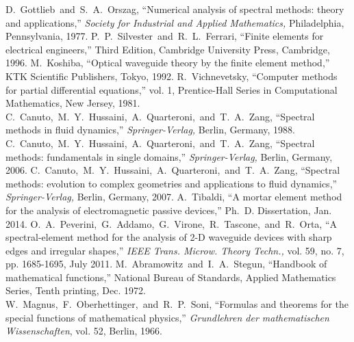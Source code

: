 \documentclass[a4paper,12pt]{article}
\begin{document}














\begin{thebibliography}{99}
 D.~Gottlieb~and~S.~A.~Orszag, ``Numerical analysis of spectral methods: theory and applications,'' \textit{Society for Industrial and Applied Mathematics,} Philadelphia, Pennsylvania, 1977.
 P.~P.~Silvester~and~R.~L.~Ferrari, ``Finite elements for electrical engineers,'' Third Edition, Cambridge University Press, Cambridge, 1996.
 M.~Koshiba, ``Optical waveguide theory by the finite element method,'' KTK Scientific Publishers, Tokyo, 1992.
 R.~Vichnevetsky, ``Computer methods for partial differential equations,'' vol. 1, Prentice-Hall Series in Computational Mathematics, New Jersey, 1981.
 C.~Canuto,~M.~Y.~Hussaini,~A.~Quarteroni,~and~T.~A.~Zang, ``Spectral methods in fluid dynamics,'' \textit{Springer-Verlag,} Berlin, Germany, 1988.
 C.~Canuto,~M.~Y.~Hussaini,~A.~Quarteroni,~and~T.~A.~Zang, ``Spectral methods: fundamentals in single domains,'' \textit{Springer-Verlag,} Berlin, Germany, 2006.
 C.~Canuto,~M.~Y.~Hussaini,~A.~Quarteroni,~and~T.~A.~Zang, ``Spectral methods: evolution to complex geometries and applications to fluid dynamics,'' \textit{Springer-Verlag,} Berlin, Germany, 2007.
 A.~Tibaldi, ``A mortar element method for the analysis of electromagnetic passive devices,'' Ph.~D. Dissertation, Jan. 2014.
 O.~A.~Peverini,~G.~Addamo,~G.~Virone,~R.~Tascone,~and~R.~Orta, ``A spectral-element method for the analysis of 2-D waveguide devices with sharp edges and irregular shapes,'' \emph{IEEE Trans. Microw. Theory Techn.,} vol. 59, no. 7, pp. 1685-1695, July 2011.
 M.~Abramowitz~and~I.~A.~Stegun, ``Handbook of mathematical functions,'' National Bureau of Standards, Applied Mathematics Series, Tenth printing, Dec. 1972.
 W.~Magnus,~F.~Oberhettinger,~and~R.~P.~Soni, ``Formulas and theorems for the special functions of mathematical physics,'' \textit{Grundlehren der mathematischen Wissenschaften}, vol. 52, Berlin, 1966.

\end{thebibliography}
\end{document}
